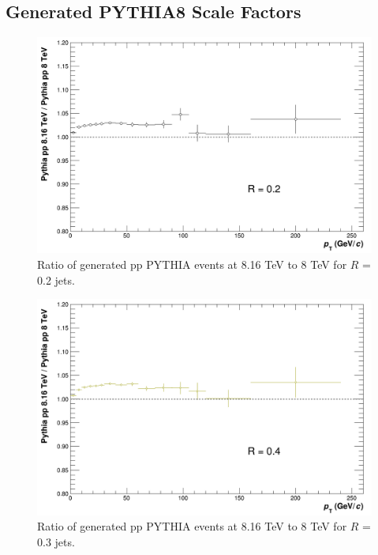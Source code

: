 \documentclass[ALICE]{ALICE_analysis_notes}
\newcommand{\pp}{pp\xspace}
\begin{document}
\begin{appendix}
\section{Generated PYTHIA8 Scale Factors}\label{sec:appendixScaleFactors}

\begin{figure}[h!]
    \centering
    \includegraphics[width=\textwidth]{figures/ScaleFactorPythia/PythiaRatio_R02.png}
    \caption{Ratio of generated \pp PYTHIA events at 8.16 TeV to 8 TeV for $R$ = 0.2 jets.}
    \label{fig:appPythiaScaleFactorR02}
\end{figure}

\begin{figure}[h!]
    \centering
    \includegraphics[width=\textwidth]{figures/ScaleFactorPythia/PythiaRatio_R04.png}
    \caption{Ratio of generated \pp PYTHIA events at 8.16 TeV to 8 TeV for $R$ = 0.3 jets.}
    \label{fig:appPythiaScaleFactorR03}
\end{figure}


\end{appendix}
\end{document}
